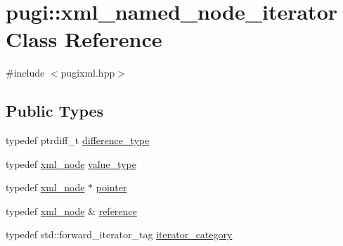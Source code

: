 \hypertarget{classpugi_1_1xml__named__node__iterator}{\section{pugi\-:\-:xml\-\_\-named\-\_\-node\-\_\-iterator Class Reference}
\label{classpugi_1_1xml__named__node__iterator}
}


{\ttfamily \#include $<$pugixml.\-hpp$>$}

\subsection*{Public Types}
\begin{DoxyCompactItemize}
\item 
typedef ptrdiff\-\_\-t \hyperlink{classpugi_1_1xml__named__node__iterator_a18fa0d610fea4d64271729abc0e28849}{difference\-\_\-type}
\item 
typedef \hyperlink{classpugi_1_1xml__node}{xml\-\_\-node} \hyperlink{classpugi_1_1xml__named__node__iterator_a8d98d8218ea9740ceb990ef2c1a456e2}{value\-\_\-type}
\item 
typedef \hyperlink{classpugi_1_1xml__node}{xml\-\_\-node} $\ast$ \hyperlink{classpugi_1_1xml__named__node__iterator_aebf72c68ded20cf483a10c6b94aa3f57}{pointer}
\item 
typedef \hyperlink{classpugi_1_1xml__node}{xml\-\_\-node} \& \hyperlink{classpugi_1_1xml__named__node__iterator_a1c338c7a2aefe04b83f746a963df808b}{reference}
\item 
typedef std\-::forward\-\_\-iterator\-\_\-tag \hyperlink{classpugi_1_1xml__named__node__iterator_a8d3aa9d72f7b79c82f40933b3b0db9cd}{iterator\-\_\-category}
\end{DoxyCompactItemize}
